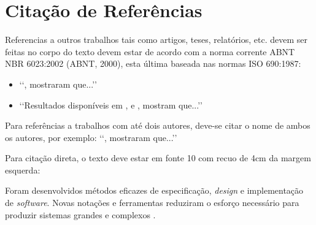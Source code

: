 \section{Citação de Referências}

Referencias a outros trabalhos tais como artigos, teses, relatórios, etc. devem
ser feitas no corpo do texto devem estar de acordo com a norma corrente ABNT
NBR 6023:2002 (ABNT, 2000), esta última baseada nas normas ISO 690:1987:
\begin{itemize}
	\item \lq\lq {}, mostraram que...\rq\rq

	\item \lq\lq Resultados disponíveis em \cite{coimbra1978}, \cite{clark1986}
	e \cite{sparrow1980}, mostram que...\rq\rq
\end{itemize}

Para referências a trabalhos com até dois autores, deve-se citar o nome de
ambos os autores, por exemplo: \lq\lq {}, mostraram
que...\rq\rq

Para citação direta, o texto deve estar em fonte 10 com recuo de 4cm da margem esquerda:

\begin{citacao}
Foram desenvolvidos métodos eficazes de especificação, \textit{design} e implementação de \textit{software}.  Novas notações e ferramentas reduziram o esforço necessário para produzir sistemas grandes e complexos \cite{Sommerville2007}.
\end{citacao}

